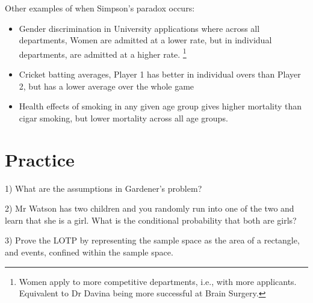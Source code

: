 \documentclass[11pt,a4paper]{article}
\begin{document}
Other examples of when Simpson's paradox occurs:
\begin{itemize}
\item Gender discrimination in University applications where across all departments, 
Women are admitted at a lower rate, 
but in individual departments, 
are admitted at a higher rate.%
\footnote{Women apply to more competitive departments, 
i.e., with more applicants. 
Equivalent to Dr Davina being more successful at Brain Surgery.}
\item Cricket batting averages, 
Player 1 has better in individual overs than Player 2, 
but has a lower average over the whole game 
\item Health effects of smoking in any given age group gives higher mortality than cigar smoking, 
but lower mortality across all age groups.
\end{itemize}

\section{Practice}\label{practice}

1) What are the assumptions in Gardener's problem?

2) Mr Watson has two children and you randomly run into one of the two and learn that she is a girl. 
What is the conditional probability that both are girls?

3) Prove the LOTP by representing the sample space as the area of a rectangle, 
and events, confined within the sample space.
\end{document}
